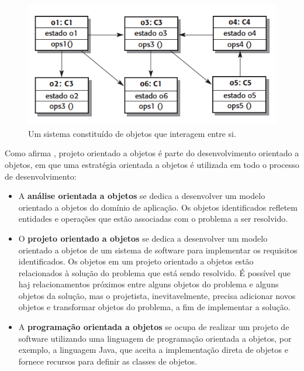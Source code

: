 \begin{figure}[H]
  \centering
  \includegraphics[scale=0.6]{imagens/figura-01.png}
  \caption{Um sistema constituído de objetos que interagem entre si.}
  \label{fig:figura-01}
\end{figure}

Como afirma , projeto orientado a objetos é parte do desenvolvimento orientado a objetos, em que uma estratégia orientada a objetos é utilizada em todo o processo de desenvolvimento:

\begin{itemize}
  \item A \textbf{análise orientada a objetos} se dedica a desenvolver um modelo orientado a objetos do domínio de aplicação. Os objetos identificados refletem entidades e operações que estão associadas com o problema a ser resolvido.

  \item O \textbf{projeto orientado a objetos} se dedica a desenvolver um modelo orientado a objetos de um sistema de software para implementar os requisitos identificados. Os objetos em um projeto orientado a objetos estão relacionados à solução do problema que está sendo resolvido. É possível que haj relacionamentos próximos entre alguns objetos do problema e alguns objetos da solução, mas o projetista, inevitavelmente, precisa adicionar novos objetos e transformar objetos do problema, a fim de implementar a solução.

  \item A \textbf{programação orientada a objetos} se ocupa de realizar um projeto de software utilizando uma linguagem de programação orientada a objetos, por exemplo, a linguagem Java, que aceita a implementação direta de objetos e fornece recursos para definir as classes de objetos.
\end{itemize}

